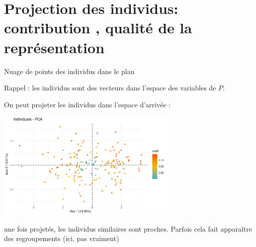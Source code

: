 \documentclass{beamer}
\begin{document}
\section{Projection des individus: contribution , qualité de la représentation}


\begin{frame}{Nuage de points des individus dans le plan}

Rappel : les individus sont des vecteurs dans l'espace des variables de $P$. 

On peut projeter les individus dans l'espace d'arrivée : 

\begin{center}
\includegraphics[width=0.65\textwidth,keepaspectratio]{img/cercle_trigo_ACP_ind.png}
\end{center}
\begin{spacing}{0.7}
une fois projetés, les individus similaires sont proches.
Parfois cela fait apparaître des regroupements (ici, pas vraiment) 
\end{spacing}

\end{frame}
\end{document}
